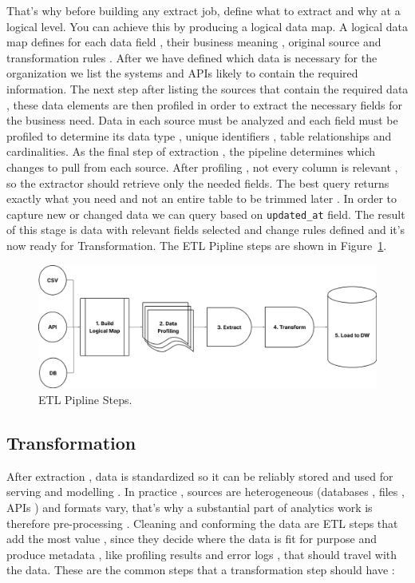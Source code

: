 That's why before building any extract job, define what to extract and why at a logical level. You can achieve this by producing a logical data map. A logical data map defines for each data field , their business meaning , original source and transformation rules \cite{kimball:2004}. After we have defined which data is necessary for the organization we list the systems and APIs likely to contain the required information. The next step after listing the sources that contain the required data , these data elements are then profiled in order to extract the necessary fields for the business need. Data in each source must be analyzed and each field must be profiled to determine its data type , unique identifiers , table relationships and cardinalities. As the final step of extraction , the pipeline determines which changes to pull from each source. After profiling , not every column is relevant , so the extractor should retrieve only the needed fields. The best query returns exactly what you need and not an entire table to be trimmed later \cite{kimball:2004}. In order to capture new or changed data we can query based on \texttt{updated\_at} field. The result of this stage is data with relevant fields selected and change rules defined and it's now ready for Transformation.
The ETL Pipline steps are shown in Figure~\ref{fig:etl_steps}.

\begin{figure}[htbp]
  \centering
  \includegraphics[width=0.8\linewidth]{gfx/examples/etl_steps.jpeg}
  \caption{ETL Pipline Steps.}
  \label{fig:etl_steps}
\end{figure}

\subsection{Transformation}
After extraction , data is standardized so it can be reliably stored and used for serving and modelling \cite{mandala:2019}. In practice , sources are heterogeneous (databases , files , APIs ) and formats vary, that's why a substantial part of analytics work is therefore pre-processing \cite{gjcs:2023} . Cleaning and conforming the data are ETL steps that add the most value , since they decide where the data is fit for purpose and produce metadata , like profiling results and error logs , that should travel with the data. These are the common steps that a transformation step should have \cite{bilal:2022}:

